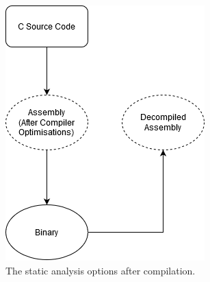 \documentclass[twocolumn]{article}
\begin{document}
\begin{figure}
    \centering
    \includegraphics[width=\linewidth]{compilation.png}
    \caption{The static analysis options after compilation.}
    \label{fig:analysis}
\end{figure}


\end{document}
